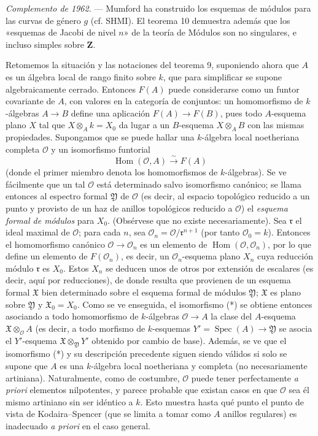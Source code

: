 \documentclass[11pt,twoside,openany]{book}
\numberwithin{equation}{section}
\newcommand{\src}[1]{%
  \phantomsection\hypertarget{src:#1}{}%
  \marginpar{\raggedleft\footnotesize\sffamily #1}%
}
\theoremstyle{plain}
\theoremstyle{definition}
\theoremstyle{remark}
\newcommand{\FgaUnitKey}{frontmatter}
\renewcommand{\src}[1]{%
  \phantomsection\hypertarget{src:\FgaUnitKey:#1}{}%
  \marginpar{\raggedleft\footnotesize\sffamily #1}%
}
\theoremstyle{plain}
\theoremstyle{definition}
\theoremstyle{remark}
\begin{document}
\emph{Complemento de 1962.} --- Mumford ha construido los esquemas de módulos
para las curvas de género $g$ (cf. SHMI). El teorema 10 demuestra además que
los «esquemas de Jacobi de nivel $n$» de la teoría de Módulos son no singulares,
e incluso simples sobre $\mathbf Z$.

\src{208}
Retomemos la situación y las notaciones del teorema 9, suponiendo ahora que $A$
es un álgebra local de rango finito sobre $k$, que para simplificar se supone
algebraicamente cerrado. Entonces $F(A)$ puede considerarse como un funtor
covariante de $A$, con valores en la categoría de conjuntos: un homomorfismo de
$k$-álgebras $A\longrightarrow B$ define una aplicación
$F(A)\longrightarrow F(B)$, pues todo $A$-esquema plano $X$ tal que
$X\otimes_A k=X_0$ da lugar a un $B$-esquema $X\otimes_A B$ con las mismas
propiedades. Supongamos que se puede hallar una $k$-álgebra local noetheriana
completa $\mathcal O$ y un isomorfismo funtorial
\begin{equation}
  \tag{*}
  \operatorname{Hom}(\mathcal O,A)\xrightarrow{\sim}F(A)
\end{equation}
(donde el primer miembro denota los homomorfismos de $k$-álgebras). Se ve
fácilmente que un tal $\mathcal O$ está determinado salvo isomorfismo canónico;
se llama entonces al espectro formal $\mathfrak Y$ de $\mathcal O$ (es decir,
al espacio topológico reducido a un punto y provisto de un haz de anillos
topológicos reducido a $\mathcal O$) el \emph{esquema formal de módulos} para
$X_0$. (Obsérvese que no existe necesariamente). Sea $\mathfrak r$ el ideal
maximal de $\mathcal O$; para cada $n$, sea
$\mathcal O_n=\mathcal O/\mathfrak r^{n+1}$ (por tanto $\mathcal O_0=k$).
Entonces el homomorfismo canónico $\mathcal O\longrightarrow\mathcal O_n$ es un
elemento de $\operatorname{Hom}(\mathcal O,\mathcal O_n)$, por lo que define un
elemento de $F(\mathcal O_n)$, es decir, un $\mathcal O_n$-esquema plano $X_n$
cuya reducción módulo $\mathfrak r$ es $X_0$. Estos $X_n$ se deducen unos de
otros por extensión de escalares (es decir, aquí por reducciones), de donde
resulta que provienen de un esquema formal $\mathfrak X$ bien determinado sobre
el esquema formal de módulos $\mathfrak Y$; $\mathfrak X$ es plano sobre
$\mathfrak Y$ y $\mathfrak X_0=X_0$. Como se ve enseguida, el isomorfismo (*)
se obtiene entonces asociando a todo homomorfismo de $k$-álgebras
$\mathcal O\longrightarrow A$ la clase del $A$-esquema
$\mathfrak X\otimes_{\mathcal O}A$ (es decir, a todo morfismo de $k$-esquemas
$Y'=\operatorname{Spec}(A)\longrightarrow\mathfrak Y$ se asocia el
$Y'$-esquema $\mathfrak X\otimes_{\mathfrak Y}Y'$ obtenido por cambio de base).
Además, se ve que el isomorfismo (*) y su descripción precedente siguen siendo
válidos si solo se supone que $A$ es una $k$-álgebra local noetheriana y
completa (no necesariamente artiniana). Naturalmente, como de costumbre,
$\mathcal O$ puede tener perfectamente \textit{a priori} elementos nilpotentes,
y parece probable que existan casos en que $\mathcal O$ sea él mismo artiniano
sin ser idéntico a $k$. Esto muestra hasta qué punto el punto de vista de
Kodaira--Spencer (que se limita a tomar como $A$ anillos regulares) es
inadecuado \textit{a priori} en el caso general.
\end{document}
